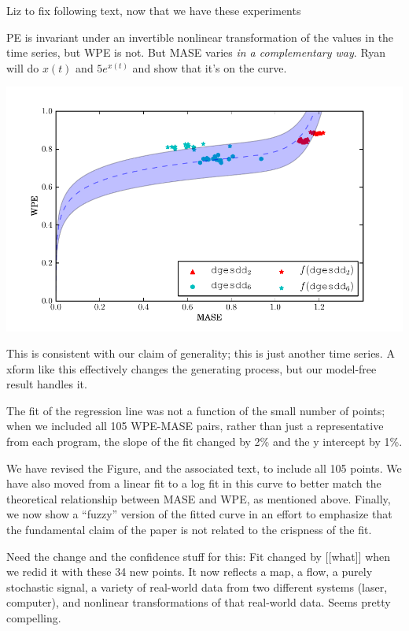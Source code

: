 \documentclass[12pt]{article}
\newcommand{\alert}[1]{{\color{red}#1}}
\begin{document}
\alert{Liz to fix following text, now that we have these experiments}

PE is invariant under an invertible nonlinear transformation of the
values in the time series, but WPE is not.  But MASE varies \emph{in a
  complementary way}.  Ryan will do $x(t)$ and $5e^{x(t)}$ and show
that it's on the curve.

\begin{center}
    \includegraphics[width=0.8\columnwidth]{figs/nonlinear_transform_data}
\end{center}

This is consistent with our claim of generality; this is just another
time series.  A xform like this effectively changes the generating
process, but our model-free result handles it.

The fit of the regression line was not a function of the small number
of points; when we included all 105 WPE-MASE pairs, rather than just a
representative from each program, the slope of the fit changed by 2\%
and the y intercept by 1\%.

We have revised the Figure, and the associated text, to include all
105 points.  We have also moved from a linear fit to a log fit in this
curve to better match the theoretical relationship between MASE and
WPE, as mentioned above.  Finally, we now show a ``fuzzy'' version of
the fitted curve in an effort to emphasize that the fundamental claim
of the paper is not related to the crispness of the fit.

\alert{Need the change and the confidence stuff for this: Fit changed
  by [[what]] when we redid it with these 34 new points.}  It now
reflects a map, a flow, a purely stochastic signal, a variety of
real-world data from two different systems (laser, computer), and
nonlinear transformations of that real-world data.  Seems pretty
compelling.
\end{document}
